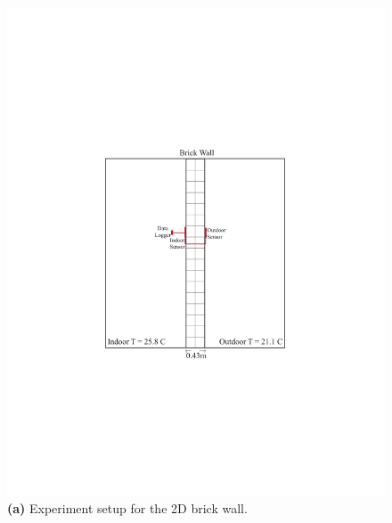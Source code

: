 \begin{figure}[tbh]
\begin{minipage}{0.47\textwidth}
  \centering
  \includegraphics[trim=5.6cm 7.5cm 5.3cm 8cm, clip, width=.95\linewidth]{Figures/2dsection2.pdf}
  \caption*{\textbf{(a)} Experiment setup for the 2D brick wall.}
\end{minipage}%
\hspace{0.1\textwidth}
\begin{minipage}{0.47\textwidth}
  \centering

\end{minipage}
\end{figure}

